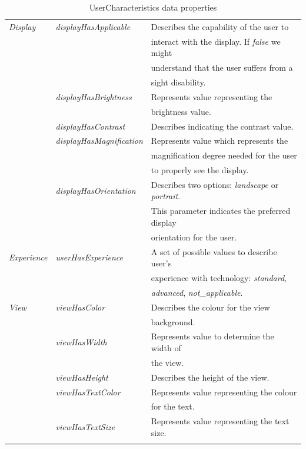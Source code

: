 \begin{center}
\begin{longtable}{l l l}
  \textit{Display}	& \textit{displayHasApplicable}	& Describes the capability of the user to 				\\
			& 				& interact with the display. If \textit{false} we might 		\\
			& 				& understand that the user suffers from a 	 			\\
			&				& sight disability.							\\
			& \textit{displayHasBrightness}	& Represents value representing the 	 				\\
			&				& brightness value.							\\
			& \textit{displayHasContrast}	& Describes indicating the contrast value.				\\
			& \textit{displayHasMagnification}& Represents value which represents the 		 		\\ 
			&				& magnification degree needed for the user	 			\\
			&				& to properly see the display.						\\
			& \textit{displayHasOrientation}& Describes two options: \textit{landscape} or \textit{portrait}.  	\\
			& 				& This parameter indicates the preferred display 		 	\\
			&				& orientation for the user.						\\
  
  \textit{Experience}	& \textit{userHasExperience}	& A set of possible values to describe user’s 		 		\\
			& 				& experience with technology: \textit{standard}, 		 	\\
			&				& \textit{advanced}, \textit{not\_applicable}.				\\
  
  \textit{View}		& \textit{viewHasColor}		& Describes the colour for the view 					\\
			& 				& background.								\\
			& \textit{viewHasWidth}		& Represents value to determine the width of 				\\
			&				& the view.								\\
			& \textit{viewHasHeight}	& Describes the height of the view.					\\
			& \textit{viewHasTextColor}	& Represents value representing the colour 				\\
			&				& for the text.								\\
			& \textit{viewHasTextSize}	& Represents value representing the text size.				\\
  \hline 
\caption{UserCharacteristics data properties}
\end{longtable}
\end{center}


